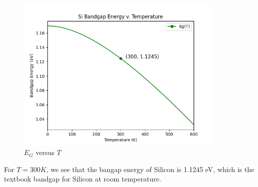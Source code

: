 \documentclass{article}
\begin{document}
\begin{figure}[!ht] 
    \centering
    \includegraphics[width = 10cm]{bandgapTempPlot.png}
    \caption{\(E_G\) versus \(T\)}
    \label{fig:bandgapTemp}
\end{figure}

\bigskip

For \(T = 300K\), we see that the bangap energy of Silicon is 1.1245 eV, which is the textbook bandgap for Silicon at room temperature.
\end{document}
